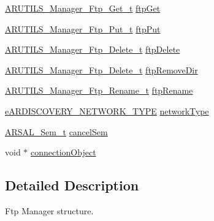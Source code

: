 \begin{DoxyCompactItemize}
\item 
\hyperlink{_a_r_u_t_i_l_s___manager_8h_a0cd9bcfb0152e3f6a26d2f1cf746d3c8}{A\+R\+U\+T\+I\+L\+S\+\_\+\+Manager\+\_\+\+Ftp\+\_\+\+Get\+\_\+t} \hyperlink{struct_a_r_u_t_i_l_s___manager__t_a515c6d028fb1f36bb37c5c88c9149306}{ftp\+Get}
\item 
\hyperlink{_a_r_u_t_i_l_s___manager_8h_a9eb3f3439392f3579c2e1fe491df3ac2}{A\+R\+U\+T\+I\+L\+S\+\_\+\+Manager\+\_\+\+Ftp\+\_\+\+Put\+\_\+t} \hyperlink{struct_a_r_u_t_i_l_s___manager__t_aa8beea55f2b8eafe1277cfa83942cb74}{ftp\+Put}
\item 
\hyperlink{_a_r_u_t_i_l_s___manager_8h_a7c405367888e2dc4a42e005fc7d42d32}{A\+R\+U\+T\+I\+L\+S\+\_\+\+Manager\+\_\+\+Ftp\+\_\+\+Delete\+\_\+t} \hyperlink{struct_a_r_u_t_i_l_s___manager__t_a8156344758bcd1dc67701232ef31d921}{ftp\+Delete}
\item 
\hyperlink{_a_r_u_t_i_l_s___manager_8h_a7c405367888e2dc4a42e005fc7d42d32}{A\+R\+U\+T\+I\+L\+S\+\_\+\+Manager\+\_\+\+Ftp\+\_\+\+Delete\+\_\+t} \hyperlink{struct_a_r_u_t_i_l_s___manager__t_ad03e51b3fdf01f51c44a5e1bba1108c9}{ftp\+Remove\+Dir}
\item 
\hyperlink{_a_r_u_t_i_l_s___manager_8h_a47979a9e00eb21ecaef64933bfd1cdc3}{A\+R\+U\+T\+I\+L\+S\+\_\+\+Manager\+\_\+\+Ftp\+\_\+\+Rename\+\_\+t} \hyperlink{struct_a_r_u_t_i_l_s___manager__t_a0020057f85025d5036e48704549d095b}{ftp\+Rename}
\item 
\hyperlink{_a_r_d_i_s_c_o_v_e_r_y___discovery_8h_ac9129d58f46d32150cd2f75cd3709717}{e\+A\+R\+D\+I\+S\+C\+O\+V\+E\+R\+Y\+\_\+\+N\+E\+T\+W\+O\+R\+K\+\_\+\+T\+Y\+PE} \hyperlink{struct_a_r_u_t_i_l_s___manager__t_aa93ed3c759c870a3faa8274a923379b9}{network\+Type}
\item 
\hyperlink{_a_r_s_a_l___sem_8h_a74eaf25f9acaab7ff185cb3c30ffda1c}{A\+R\+S\+A\+L\+\_\+\+Sem\+\_\+t} \hyperlink{struct_a_r_u_t_i_l_s___manager__t_a91b82c68181c237d7fa37195496e4fbf}{cancel\+Sem}
\item 
void $\ast$ \hyperlink{struct_a_r_u_t_i_l_s___manager__t_a3d31bea4845c4f19e7072ca4aac8c544}{connection\+Object}
\end{DoxyCompactItemize}


\subsection{Detailed Description}
Ftp Manager structure. 



